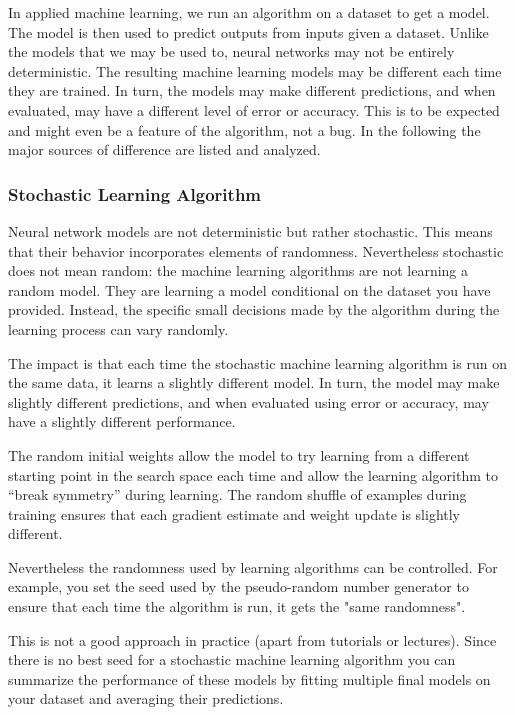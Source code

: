 In applied machine learning, we run an algorithm on a dataset to get a model. The model is then used to predict outputs from inputs given a dataset. Unlike the models that we may be used to, neural networks may not be entirely deterministic.
The resulting machine learning models may be different each time they are trained. In turn, the models may make different predictions, and when evaluated, may have a different level of error or accuracy. This is to be expected and might even be a feature of the algorithm, not a bug.
In the following the major sources of difference are listed and analyzed.

\subsubsection{Stochastic Learning Algorithm}

Neural network models are not deterministic but rather stochastic. This means that their behavior incorporates elements of randomness.
Nevertheless stochastic does not mean random: the machine learning algorithms are not learning a random model. They are learning a model conditional on the dataset you have provided. Instead, the specific small decisions made by the algorithm during the learning process can vary randomly.

The impact is that each time the stochastic machine learning algorithm is run on the same data, it learns a slightly different model. In turn, the model may make slightly different predictions, and when evaluated using error or accuracy, may have a slightly different performance.

The random initial weights allow the model to try learning from a different starting point in the search space each time and allow the learning algorithm to “break symmetry” during learning. The random shuffle of examples during training ensures that each gradient estimate and weight update is slightly different.

Nevertheless the randomness used by learning algorithms can be controlled. For example, you set the seed used by the pseudo-random number generator to ensure that each time the algorithm is run, it gets the "same randomness".

This is not a good approach in practice (apart from tutorials or lectures). Since there is no best seed for a stochastic machine learning algorithm you can summarize the performance of these models by fitting multiple final models on your dataset and averaging their predictions.

